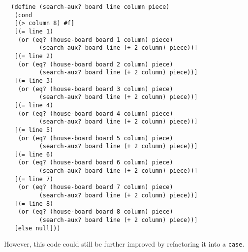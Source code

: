\begin{lstlisting}
  (define (search-aux? board line column piece)
   (cond
   [(> column 8) #f]
   [(= line 1)
    (or (eq? (house-board board 1 column) piece)
          (search-aux? board line (+ 2 column) piece))]
   [(= line 2)
    (or (eq? (house-board board 2 column) piece)
          (search-aux? board line (+ 2 column) piece))]
   [(= line 3)
    (or (eq? (house-board board 3 column) piece)
          (search-aux? board line (+ 2 column) piece))]
   [(= line 4)
    (or (eq? (house-board board 4 column) piece)
          (search-aux? board line (+ 2 column) piece))]
   [(= line 5)
    (or (eq? (house-board board 5 column) piece)
          (search-aux? board line (+ 2 column) piece))]
   [(= line 6)
    (or (eq? (house-board board 6 column) piece)
          (search-aux? board line (+ 2 column) piece))]
   [(= line 7)
    (or (eq? (house-board board 7 column) piece)
          (search-aux? board line (+ 2 column) piece))]
   [(= line 8)
    (or (eq? (house-board board 8 column) piece)
          (search-aux? board line (+ 2 column) piece))]
   [else null]))
\end{lstlisting}

However, this code could still be further improved by refactoring it into a {\tt case}. \\

